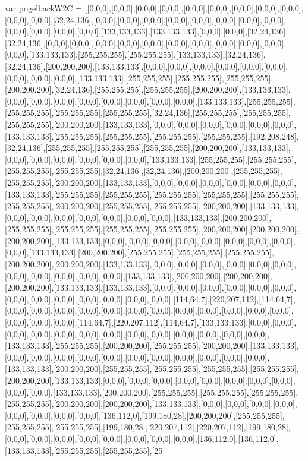 var pogelbackW2C = [[0,0,0],[0,0,0],[0,0,0],[0,0,0],[0,0,0],[0,0,0],[0,0,0],[0,0,0],[0,0,0],[0,0,0],[0,0,0],[32,24,136],[0,0,0],[0,0,0],[0,0,0],[0,0,0],[0,0,0],[0,0,0],[0,0,0],[0,0,0],[0,0,0],[0,0,0],[0,0,0],[0,0,0],[133,133,133],[133,133,133],[0,0,0],[0,0,0],[32,24,136],[32,24,136],[0,0,0],[0,0,0],[0,0,0],[0,0,0],[0,0,0],[0,0,0],[0,0,0],[0,0,0],[0,0,0],[0,0,0],[0,0,0],[133,133,133],[255,255,255],[255,255,255],[133,133,133],[32,24,136],[32,24,136],[200,200,200],[133,133,133],[0,0,0],[0,0,0],[0,0,0],[0,0,0],[0,0,0],[0,0,0],[0,0,0],[0,0,0],[0,0,0],[133,133,133],[255,255,255],[255,255,255],[255,255,255],[200,200,200],[32,24,136],[255,255,255],[255,255,255],[200,200,200],[133,133,133],[0,0,0],[0,0,0],[0,0,0],[0,0,0],[0,0,0],[0,0,0],[0,0,0],[0,0,0],[133,133,133],[255,255,255],[255,255,255],[255,255,255],[255,255,255],[32,24,136],[255,255,255],[255,255,255],[255,255,255],[200,200,200],[133,133,133],[0,0,0],[0,0,0],[0,0,0],[0,0,0],[0,0,0],[0,0,0],[133,133,133],[255,255,255],[255,255,255],[255,255,255],[255,255,255],[192,208,248],[32,24,136],[255,255,255],[255,255,255],[255,255,255],[200,200,200],[133,133,133],[0,0,0],[0,0,0],[0,0,0],[0,0,0],[0,0,0],[0,0,0],[133,133,133],[255,255,255],[255,255,255],[255,255,255],[255,255,255],[32,24,136],[32,24,136],[200,200,200],[255,255,255],[255,255,255],[200,200,200],[133,133,133],[0,0,0],[0,0,0],[0,0,0],[0,0,0],[0,0,0],[0,0,0],[133,133,133],[255,255,255],[255,255,255],[255,255,255],[255,255,255],[255,255,255],[255,255,255],[200,200,200],[255,255,255],[255,255,255],[200,200,200],[133,133,133],[0,0,0],[0,0,0],[0,0,0],[0,0,0],[0,0,0],[0,0,0],[0,0,0],[133,133,133],[200,200,200],[255,255,255],[255,255,255],[255,255,255],[255,255,255],[200,200,200],[200,200,200],[200,200,200],[133,133,133],[0,0,0],[0,0,0],[0,0,0],[0,0,0],[0,0,0],[0,0,0],[0,0,0],[0,0,0],[0,0,0],[133,133,133],[200,200,200],[255,255,255],[255,255,255],[255,255,255],[200,200,200],[200,200,200],[133,133,133],[0,0,0],[0,0,0],[0,0,0],[0,0,0],[0,0,0],[0,0,0],[0,0,0],[0,0,0],[0,0,0],[0,0,0],[0,0,0],[133,133,133],[200,200,200],[200,200,200],[200,200,200],[133,133,133],[133,133,133],[0,0,0],[0,0,0],[0,0,0],[0,0,0],[0,0,0],[0,0,0],[0,0,0],[0,0,0],[0,0,0],[0,0,0],[0,0,0],[0,0,0],[0,0,0],[114,64,7],[220,207,112],[114,64,7],[0,0,0],[0,0,0],[0,0,0],[0,0,0],[0,0,0],[0,0,0],[0,0,0],[0,0,0],[0,0,0],[0,0,0],[0,0,0],[0,0,0],[0,0,0],[0,0,0],[0,0,0],[114,64,7],[220,207,112],[114,64,7],[133,133,133],[0,0,0],[0,0,0],[0,0,0],[0,0,0],[0,0,0],[0,0,0],[0,0,0],[0,0,0],[0,0,0],[0,0,0],[0,0,0],[0,0,0],[0,0,0],[133,133,133],[255,255,255],[200,200,200],[255,255,255],[200,200,200],[133,133,133],[0,0,0],[0,0,0],[0,0,0],[0,0,0],[0,0,0],[0,0,0],[0,0,0],[0,0,0],[0,0,0],[0,0,0],[0,0,0],[133,133,133],[200,200,200],[255,255,255],[255,255,255],[255,255,255],[255,255,255],[200,200,200],[133,133,133],[0,0,0],[0,0,0],[0,0,0],[0,0,0],[0,0,0],[0,0,0],[0,0,0],[0,0,0],[0,0,0],[0,0,0],[133,133,133],[200,200,200],[255,255,255],[255,255,255],[255,255,255],[255,255,255],[200,200,200],[200,200,200],[133,133,133],[0,0,0],[0,0,0],[0,0,0],[0,0,0],[0,0,0],[0,0,0],[0,0,0],[0,0,0],[136,112,0],[199,180,28],[200,200,200],[255,255,255],[255,255,255],[255,255,255],[199,180,28],[220,207,112],[220,207,112],[199,180,28],[0,0,0],[0,0,0],[0,0,0],[0,0,0],[0,0,0],[0,0,0],[0,0,0],[0,0,0],[136,112,0],[136,112,0],[133,133,133],[255,255,255],[255,255,255],[25